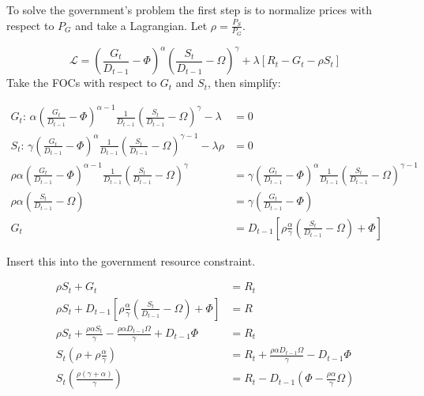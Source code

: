 \documentclass[12pt]{article}
\begin{document}
\begin{spacing}{1.5}
To solve the government's problem the first step is to normalize prices with respect to $P_G$ and take a Lagrangian. Let $\rho = \frac{P_S}{P_G}$. 

\begin{equation}
\mathcal{L} = \left(\frac{G_t}{ D_{t-1}}-\Phi\right)^\alpha \left(\frac{S_t}{ D_{t-1}}-\Omega\right)^\gamma  +\lambda[R_t- G_t - \rho S_t] 
\end{equation}
Take the FOCs with respect to $G_t$ and $S_t$, then simplify:

\begin{equation}
    \begin{aligned}
        G_t\text{: } \alpha \left(\frac{G_t}{ D_{t-1}}-\Phi\right)^{\alpha-1} \frac{1}{ D_{t-1}} \left(\frac{S_t}{D_{t-1}}-\Omega\right)^\gamma  -\lambda &=0  \\   
S_t\text{: } \gamma  \left(\frac{G_t}{ D_{t-1}}-\Phi\right)^{\alpha} \frac{1}{D_{t-1}} \left(\frac{S_t}{D_{t-1}}-\Omega\right)^{\gamma -1} -\lambda \rho &=0 \\
\rho \alpha \left(\frac{G_t}{D_{t-1}}-\Phi\right)^{\alpha-1} \frac{1}{ D_{t-1}} \left(\frac{S_t}{D_{t-1}}-\Omega\right)^\gamma  &= \gamma  \left(\frac{G_t}{ D_{t-1}}-\Phi\right)^{\alpha} \frac{1}{ D_{t-1}} \left(\frac{S_t}{ D_{t-1}}-\Omega\right)^{\gamma -1} \\
\rho \alpha \left(\frac{S_t}{ D_{t-1}}-\Omega \right) &= \gamma  \left( \frac{G_t}{ D_{t-1}}-\Phi \right) \\
G_t&= D_{t-1}\left[\rho \frac{\alpha}{\gamma } \left(\frac{S_t}{ D_{t-1}} -\Omega \right)+\Phi \right]
    \end{aligned}
\end{equation}

\noindent Insert this into the government resource constraint.  

\begin{equation}
    \begin{aligned}
        \rho S_t+G_t&=R_t \\
       \rho S_t+  D_{t-1}\left[\rho \frac{\alpha}{\gamma } \left(\frac{S_t}{ D_{t-1}} -\Omega \right) +\Phi \right]  &= R \\
\rho S_t+ \frac{\rho \alpha S_t}{\gamma } -\frac{\rho \alpha  D_{t-1} \Omega}{\gamma } +D_{t-1}\Phi &=R_t \\
S_t\left(\rho+\rho  \frac{\alpha}{\gamma }\right) &= R_t+ \frac{\rho \alpha D_{t-1} \Omega}{\gamma } - D_{t-1}\Phi \\
S_t\left(\frac{\rho(\gamma+\alpha)}{\gamma }\right) &= R_t - D_{t-1} \left(\Phi - \frac{\rho \alpha}{\gamma }\Omega \right) 
    \end{aligned}
\end{equation}


\end{spacing}
\end{document}
